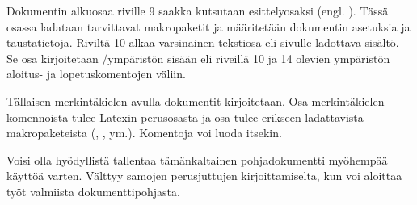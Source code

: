 Dokumentin alku\-osaa riville 9 saakka kutsutaan esittelyosaksi (engl.
). Tässä osassa ladataan tarvittavat
makropaketit ja määritetään dokumentin asetuksia ja taustatietoja.
Riviltä 10 alkaa varsinainen tekstiosa eli sivulle ladottava sisältö. Se
osa kirjoitetaan \-/ympäristön sisään eli riveillä 10 ja
14 olevien ympäristön aloi\-tus- ja lopetuskomentojen väliin.

Tällaisen merkintäkielen avulla dokumentit kirjoitetaan. Osa
merkintäkielen komennoista tulee Latexin perusosasta ja osa tulee
erikseen ladattavista makropaketeista (,
,  ym.). Komentoja voi luoda
itsekin.

Voisi olla hyödyllistä tallentaa tämänkaltainen pohjadokumentti
myöhempää käyttöä varten. Välttyy samojen perusjuttujen
kirjoittamiselta, kun voi aloittaa työt valmiista dokumenttipohjasta.

